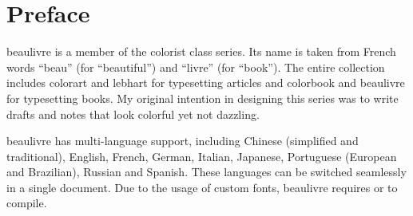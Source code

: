 \documentclass[allowbf]{beaulivre}
\providecommand{\colorist}{{\normalfont\textsf{colorist}}}
\providecommand{\colorart}{{\normalfont\textsf{colorart}}}
\providecommand{\colorbook}{{\normalfont\textsf{colorbook}}}
\providecommand{\lebhart}{{\normalfont\textsf{lebhart}}}
\providecommand{\beaulivre}{{\normalfont\textsf{beaulivre}}}
\begin{document}


\frontmatter

\begin{titlepage} %
%
\end{titlepage}%
\cleardoublepage%

\frontmatter
\chapter*{Preface}

\beaulivre{} is a member of the \colorist{} class series. Its name is taken from French words ``beau'' (for ``beautiful'') and ``livre'' (for ``book''). The entire collection includes \colorart{} and \lebhart{} for typesetting articles and \colorbook{} and \beaulivre{} for typesetting books. My original intention in designing this series was to write drafts and notes that look colorful yet not dazzling.

\beaulivre{} has multi-language support, including Chinese (simplified and traditional), English, French, German, Italian, Japanese, Portuguese (European and Brazilian), Russian and Spanish. These languages can be switched seamlessly in a single document. Due to the usage of custom fonts, \beaulivre{} requires  or  to compile.
\end{document}

